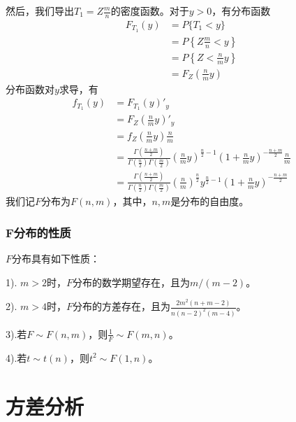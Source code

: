         然后，我们导出$T_1 = Z\frac{m}{n}$的密度函数。对于$y>0$，有分布函数
        \begin{align*}
        F_{T_1}(y) &= P\{T_1<y\}\\
        &=P\left\{Z\frac{m}{n}<y\right\}\\
        &=P\left\{Z<\frac{n}{m}y\right\}\\
        &=F_Z\left(\frac{n}{m}y\right)
        \end{align*}
        分布函数对$y$求导，有
        \begin{align*}
        f_{T_1}(y) &= F_{T_1}(y)'_y\\
        &= F_Z\left(\frac{n}{m}y\right)'_y\\
        &=f_Z\left(\frac{n}{m}y\right)\frac{n}{m}\\
        &=\frac{\Gamma \left( \frac{n+m}{2} \right) }{\Gamma \left( \frac{n}{2} \right) \Gamma \left( \frac{m}{2} \right)} \left(\frac{n}{m}y\right)^{\frac{n}{2}-1}\left(1+\frac{n}{m}y\right)^{-\frac{n+m}{2}} \frac{n}{m}\\
        &=\frac{\Gamma \left( \frac{n+m}{2} \right) }{\Gamma \left( \frac{n}{2} \right) \Gamma \left( \frac{m}{2} \right)}\left(\frac{n}{m}\right)^{\frac{n}{2}}y^{\frac{n}{2}-1}\left(1+\frac{n}{m}y\right)^{-\frac{n+m}{2}}
        \end{align*}
        我们记$F$分布为$F(n,m)$，其中，$n,m$是分布的自由度。

        \subsubsection{F分布的性质}
            $F$分布具有如下性质：
            \par
            1). $m>2$时，$F$分布的数学期望存在，且为$m/(m-2)$。
            \par
            2). $m>4$时，$F$分布的方差存在，且为$\frac{2m^2(n+m-2)}{n(n-2)^2(m-4)}$。
            \par
            3).若$F\sim F(n,m)$，则$\frac{1}{F}\sim F(m,n)$。
            \par
            4).若$t\sim t(n)$，则$t^2\sim F(1,n)$。

\section{方差分析}
